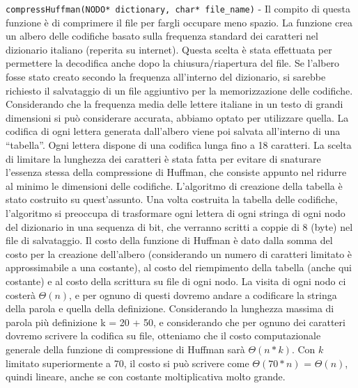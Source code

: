 \documentclass[paper=a4, fontsize=11pt,twoside]{scrartcl}   %
\begin{document}
				\texttt{compressHuffman(NODO* dictionary, char* file\_name)} - Il compito di questa funzione è di comprimere il file per fargli occupare meno spazio. La funzione crea un albero delle codifiche basato sulla frequenza standard dei caratteri nel dizionario italiano (reperita su internet). Questa scelta è stata effettuata per permettere la decodifica anche dopo la chiusura/riapertura del file. Se l’albero fosse stato creato secondo la frequenza all’interno del dizionario, si sarebbe richiesto il salvataggio di un file aggiuntivo per la memorizzazione delle codifiche. Considerando che la frequenza media delle lettere italiane in un testo di grandi dimensioni si può considerare accurata, abbiamo optato per utilizzare quella. 
				La codifica di ogni lettera generata dall’albero viene poi salvata all’interno di una “tabella”. Ogni lettera dispone di una codifica lunga fino a 18 caratteri. La scelta di limitare la lunghezza dei caratteri è stata fatta per evitare di snaturare l’essenza stessa della compressione di Huffman, che consiste appunto nel ridurre al minimo le dimensioni delle codifiche. L’algoritmo di creazione della tabella è stato costruito su quest’assunto. 
				Una volta costruita la tabella delle codifiche, l’algoritmo si preoccupa di trasformare ogni lettera di ogni stringa di ogni nodo del dizionario in una sequenza di bit, che verranno scritti a coppie di 8 (byte) nel file di salvataggio.
				Il costo della funzione di Huffman è dato dalla somma del costo per la creazione dell’albero (considerando un numero di caratteri limitato è approssimabile a una costante), al costo del riempimento della tabella (anche qui costante) e al costo della scrittura su file di ogni nodo. La visita di ogni nodo ci costerà $\Theta(n)$, e per ognuno di questi dovremo andare a codificare la stringa della parola e quella della definizione. Considerando la lunghezza massima di parola più definizione k = 20 + 50, e considerando che per ognuno dei caratteri dovremo scrivere la codifica su file, otteniamo che il costo computazionale generale della funzione di compressione di Huffman sarà $\Theta(n*k)$. Con $k$ limitato superiormente a 70, il costo si può scrivere come $\Theta(70*n)$ = $\Theta(n)$, quindi lineare, anche se con costante moltiplicativa molto grande.\par 
				
\end{document}
